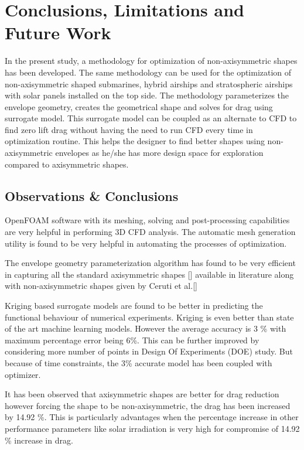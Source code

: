 \chapter{Conclusions, Limitations and Future Work}
In the present study, a methodology for optimization of non-axisymmetric shapes has been developed. The same methodology can be used for the optimization of non-axisymmetric shaped submarines, hybrid airships and stratospheric airships with solar panels installed on the top side. 
The methodology parameterizes the envelope geometry, creates the geometrical shape and solves for drag using surrogate model. This surrogate model can be coupled as an alternate to CFD to find zero lift drag without having the need to run CFD every time in optimization routine. This helps the designer to find better shapes  using non-axisymmetric envelopes as he/she has more design space for exploration compared to axisymmetric shapes.
\section{Observations \& Conclusions} 
OpenFOAM software with its meshing, solving and post-processing capabilities are very helpful in performing 3D CFD analysis. The automatic mesh generation utility is found to be very helpful in automating the processes of optimization. 

The envelope geometry parameterization algorithm has found to be very efficient in capturing all the standard axisymmetric shapes [] available in literature along with non-axisymmetric shapes given by Ceruti et al.[]



Kriging based surrogate models are found to be better in predicting the functional behaviour of numerical experiments. Kriging is even better than state of the art machine learning models. However the average accuracy is 3 \% with maximum percentage error being 6\%. This can be further improved by considering more number of points in Design Of Experiments (DOE) study. But because of time constraints, the 3\% accurate model has been coupled with optimizer. 

It has been observed that axisymmetric shapes are better for drag reduction however forcing the shape to be non-axisymmetric, the drag has been increased by 14.92 \%. This is particularly advantages when the percentage increase in other performance parameters like solar irradiation is very high for compromise of 14.92 \% increase in drag.

